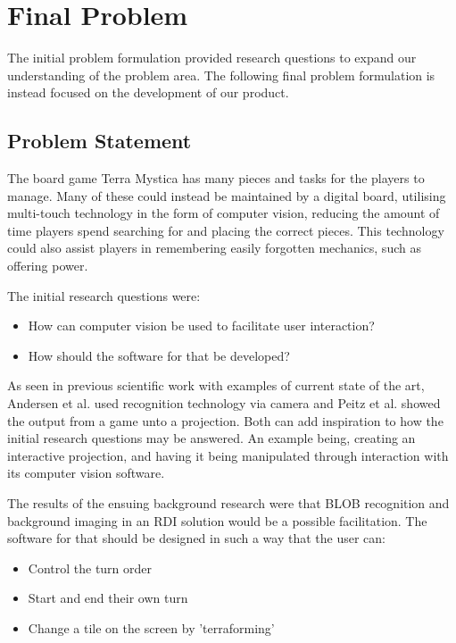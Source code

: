 \chapter{Final Problem}\label{ch:finprob}
The initial problem formulation provided research questions to expand our understanding of the problem area. The following final problem formulation is instead focused on the development of our product.

\section{Problem Statement}
The board game Terra Mystica has many pieces and tasks for the players to manage. Many of these could instead be maintained by a digital board, utilising multi-touch technology in the form of computer vision, reducing the amount of time players spend searching for and placing the correct pieces. This technology could also assist players in remembering easily forgotten mechanics, such as offering power.

The initial research questions were:
\begin{itemize}
	\item How can computer vision be used to facilitate user interaction?
	\item How should the software for that be developed?
\end{itemize}

As seen in previous scientific work with examples of current state of the art, Andersen et al. \citep{andersen_designing_2004} used recognition technology via camera and Peitz et al. \citep{peitzWizards2006} showed the output from a game unto a projection. Both can add inspiration to how the initial research questions may be answered. An example being, creating an interactive projection, and having it being manipulated through interaction with its computer vision software.

The results of the ensuing background research were that BLOB recognition and background imaging in an RDI solution would be a possible facilitation.
The software for that should be designed in such a way that the user can:
\begin{itemize}
\item Control the turn order
\item Start and end their own turn
\item Change a tile on the screen by 'terraforming'
\end{itemize}


